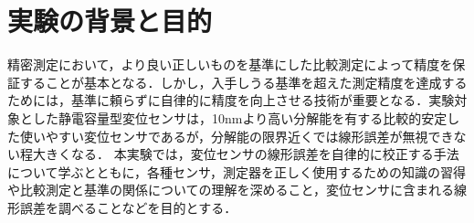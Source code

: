 \section{実験の背景と目的}
精密測定において，より良い正しいものを基準にした比較測定によって精度を保証することが基本となる．しかし，入手しうる基準を超えた測定精度を達成するためには，基準に頼らずに自律的に精度を向上させる技術が重要となる．実験対象とした静電容量型変位センサは，10nmより高い分解能を有する比較的安定した使いやすい変位センサであるが，分解能の限界近くでは線形誤差が無視できない程大きくなる．
本実験では，変位センサの線形誤差を自律的に校正する手法について学ぶとともに，各種センサ，測定器を正しく使用するための知識の習得や比較測定と基準の関係についての理解を深めること，変位センサに含まれる線形誤差を調べることなどを目的とする．